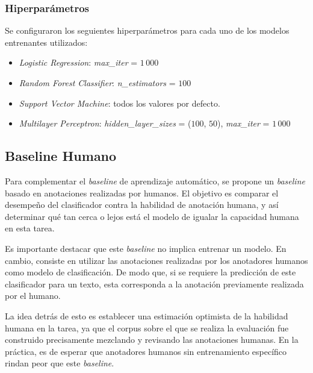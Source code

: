 \subsubsection{Hiperpar\'ametros}
Se configuraron los seguientes hiperpar\'ametros para cada uno de los modelos entrenantes utilizados:
\begin{itemize}
    \item \emph{Logistic Regression}: \emph{max\_iter} = $1\,000$
    \item \emph{Random Forest Classifier}: \emph{n\_estimators} = $100$
    \item \emph{Support Vector Machine}: todos los valores por defecto.
    \item \emph{Multilayer Perceptron}: \emph{hidden\_layer\_sizes} = ($100$, $50$), \emph{max\_iter} = $1\,000$
\end{itemize}


\subsection{Baseline Humano}\label{subsection:human_baseline}
Para complementar el \emph{baseline} de aprendizaje autom\'atico, se propone un \emph{baseline} 
basado en anotaciones realizadas por humanos. El objetivo es comparar el desempe\~no del 
clasificador contra la habilidad de anotaci\'on humana, y as\'i 
determinar qu\'e tan cerca o lejos est\'a el modelo de igualar la capacidad humana en 
esta tarea.

Es importante destacar que este \emph{baseline} no implica entrenar un modelo. En cambio,
consiste en utilizar las anotaciones realizadas por los anotadores humanos como modelo de 
clasificaci\'on. De modo que, si se requiere la predicci\'on de este clasificador para un texto, 
esta corresponda a la anotaci\'on previamente realizada por el humano.

La idea detr\'as de esto es establecer una estimaci\'on optimista de la habilidad humana en
la tarea, ya que el corpus sobre el que se realiza la evaluaci\'on fue construido precisamente 
mezclando y revisando las anotaciones humanas. En la pr\'actica, es de esperar que 
anotadores humanos sin entrenamiento espec\'ifico rindan peor que este \emph{baseline}.